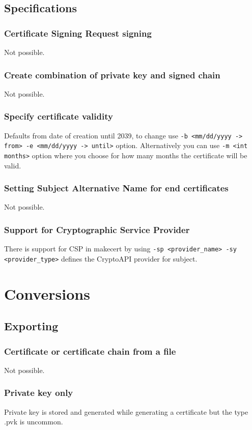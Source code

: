 \documentclass[10pt, a4paper]{report}
\begin{document}
  \subsection{Specifications}
  
    \subsubsection{Certificate Signing Request signing}
Not possible.
    \subsubsection{Create combination of private key and signed chain}
Not possible.
    \subsubsection{Specify certificate validity}
Defaults from date of creation until 2039, to change use \verb+-b <mm/dd/yyyy -> from> -e <mm/dd/yyyy -> until>+ option.
Alternatively you can use \verb+-m <int months>+ option where you choose for how many months the certificate will be valid.
    \subsubsection{Setting Subject Alternative Name for end certificates}
Not possible.
    \subsubsection{Support for Cryptographic Service Provider}
There is support for CSP in makecert by using \verb+-sp <provider_name> -sy <provider_type>+ defines the CryptoAPI provider for subject.
\section{Conversions}

  \subsection{Exporting}
  
    \subsubsection{Certificate or certificate chain from a file}
Not possible.
    \subsubsection{Private key only}
Private key is stored and generated while generating a certificate but the type .pvk is uncommon.
\end{document}
